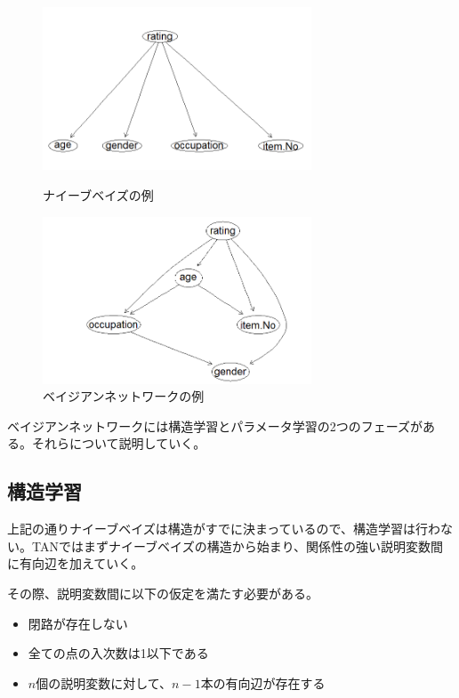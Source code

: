 \documentclass[a4j,12pt]{jarticle}
\begin{document}
\begin{figure}[H]
\begin{minipage}{0.5\hsize}
 \begin{center}
  \includegraphics[width=80mm]{data/sample1.png}
 \end{center}
 \caption{ナイーブベイズの例}
 \label{fig:fig1}
 \end{minipage}
\begin{minipage}{0.5\hsize}
 \begin{center}
  \includegraphics[width=80mm]{data/sample2.png}
 \end{center}
 \caption{ベイジアンネットワークの例}
 \label{fig:fig2}
 \end{minipage}
\end{figure}

ベイジアンネットワークには構造学習とパラメータ学習の2つのフェーズがある。それらについて説明していく。

\subsection{構造学習}

上記の通りナイーブベイズは構造がすでに決まっているので、構造学習は行わない。TANではまずナイーブベイズの構造から始まり、関係性の強い説明変数間に有向辺を加えていく。

その際、説明変数間に以下の仮定を満たす必要がある。

\begin{itemize}
\item 閉路が存在しない

\item 全ての点の入次数は1以下である

\item $n$個の説明変数に対して、$n-1$本の有向辺が存在する
\end{itemize}
\end{document}
